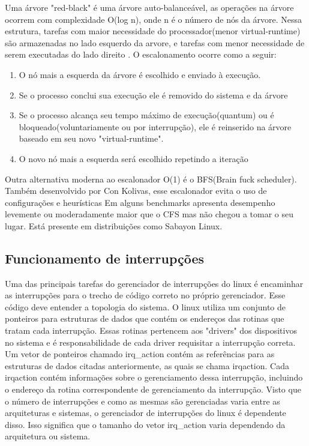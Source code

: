 \documentclass[conference]{IEEEtran}
\begin{document}
Uma árvore "red-black" é uma árvore auto-balanceável, as operações na árvore ocorrem com complexidade O(log n), onde n é o número de nós da árvore. Nessa estrutura, tarefas com maior necessidade do processador(menor virtual-runtime) são armazenadas no lado esquerdo da arvore, e tarefas com menor necessidade de serem executadas do lado direito \cite{LinuxSchedulerIBM}. O escalonamento ocorre como a seguir:
\begin{enumerate}
	\item O nó mais a esquerda da árvore é escolhido e enviado à execução.
	\item Se o processo conclui sua execução ele é removido do sistema e da árvore
	\item Se o processo alcança seu tempo máximo de execução(quantum) ou é bloqueado(voluntariamente ou por interrupção), ele é reinserido na árvore baseado em seu novo "virtual-runtime".
	\item O novo nó mais a esquerda será escolhido repetindo a iteração\cite{LinuxSchedulerWiki}
\end{enumerate}

Outra alternativa moderna ao escalonador O(1) é o BFS(Brain fuck scheduler). Também desenvolvido por Con Kolivas, esse escalonador evita o uso de configurações e heurísticas Em alguns benchmarks apresenta desempenho levemente ou moderadamente maior que o CFS mas não chegou a tomar o seu lugar. Está presente em distribuições como Sabayon Linux\cite{LinuxSchedulerBFS}.
\cite{LinuxSchedulerWiki}

\subsection{Funcionamento de interrupções}\label{sec:LinuxInt}
Uma das principais tarefas do gerenciador de interrupções do linux é encaminhar as interrupções para o trecho de código correto no próprio gerenciador. Esse código deve entender a topologia do sistema. O linux utiliza um conjunto de ponteiros para estruturas de dados que contém os endereços das rotinas que tratam cada interrupção. Essas rotinas pertencem aos "drivers" dos dispositivos no sistema e é responsabilidade de cada driver requisitar a interrupção correta. Um vetor de ponteiros chamado irq\_action contém as referências para as estruturas de dados citadas anteriormente, as quais se chama irqaction. Cada irqaction contém informações sobre o gerenciamento dessa interrupção, incluindo o endereço da rotina correspondente de gerenciamento da interrupção. Visto que o número de interrupções e como as mesmas são gerenciadas varia entre as arquiteturas e sistemas, o gerenciador de interrupções do linux é dependente disso. Isso significa que o tamanho do vetor irq\_action varia dependendo da arquitetura ou sistema.\\
\end{document}
